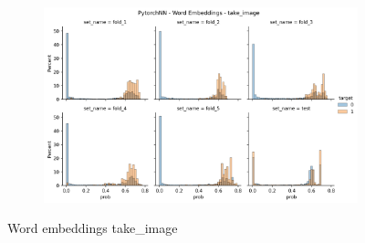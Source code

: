 \begin{figure}
\begin{subfigure}[b]{0.83\textwidth}
        \includegraphics[width=\linewidth]{figures/results/word_embeddings/nn/take_image/take_image__distplot (1).png}
    \end{subfigure}
    \caption{Word embeddings take\_image}
\end{figure}

